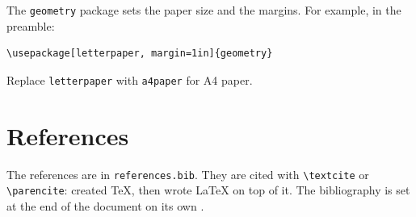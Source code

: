 \documentclass{article}
\begin{document}
The \texttt{geometry} package sets the paper size and the margins. For
example, in the preamble:
\begin{verbatim}
\usepackage[letterpaper, margin=1in]{geometry}
\end{verbatim}
Replace \texttt{letterpaper} with \texttt{a4paper} for A4 paper.

\section{References}

The references are in \texttt{references.bib}. They are cited with
\verb|\textcite| or \verb|\parencite|: \textcite{knuth1984} created \TeX{},
then \textcite{lamport1994} wrote \LaTeX{} on top of it. The bibliography is
set at the end of the document on its own \parencite{mittelbach2023}.

\printbibliography
\end{document}
